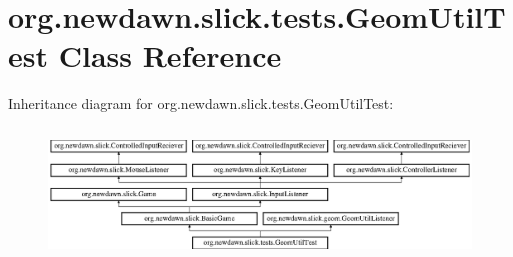 \hypertarget{classorg_1_1newdawn_1_1slick_1_1tests_1_1_geom_util_test}{}\section{org.\+newdawn.\+slick.\+tests.\+Geom\+Util\+Test Class Reference}
\label{classorg_1_1newdawn_1_1slick_1_1tests_1_1_geom_util_test}
Inheritance diagram for org.\+newdawn.\+slick.\+tests.\+Geom\+Util\+Test\+:\begin{figure}[H]
\begin{center}
\leavevmode
\includegraphics[height=3.522012cm]{classorg_1_1newdawn_1_1slick_1_1tests_1_1_geom_util_test}
\end{center}
\end{figure}

